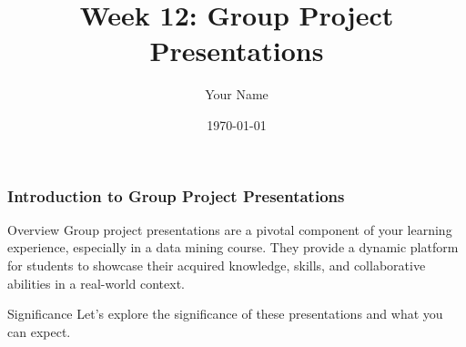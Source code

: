 \documentclass{beamer}
\title{Week 12: Group Project Presentations}
\author{Your Name}
\institute{Your Institution}
\date{\today}
\begin{document}
\frame{\titlepage}

\begin{frame}[fragile]
    \frametitle{Introduction to Group Project Presentations}
    \begin{block}{Overview}
        Group project presentations are a pivotal component of your learning experience, especially in a data mining course. They provide a dynamic platform for students to showcase their acquired knowledge, skills, and collaborative abilities in a real-world context.
    \end{block}
    \begin{block}{Significance}
        Let's explore the significance of these presentations and what you can expect.
    \end{block}
\end{frame}
\end{document}
